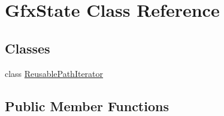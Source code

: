\hypertarget{class_gfx_state}{}\section{Gfx\+State Class Reference}
\label{class_gfx_state}
\subsection*{Classes}
\begin{DoxyCompactItemize}
\item 
class \hyperlink{class_gfx_state_1_1_reusable_path_iterator}{Reusable\+Path\+Iterator}
\end{DoxyCompactItemize}
\subsection*{Public Member Functions}
